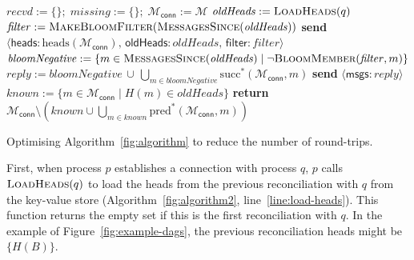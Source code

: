\documentclass[a4paper,anonymous,USenglish]{lipics-v2019}
\begin{document}
\begin{algorithm}[t]
    \begin{algorithmic}[1]
        \State $\mathit{recvd} := \{\};\; \mathit{missing} := \{\};\; \mathcal{M}_\mathsf{conn} := \mathcal{M}$ 
        \State $\mathit{oldHeads} := \Call{LoadHeads}{q}$\label{line:load-heads}
        \State $\mathit{filter} := \textsc{MakeBloomFilter}(\Call{MessagesSince}{\mathit{oldHeads}})$\label{line:make-bloom}
        \State \textbf{send} $\langle\mathsf{heads}: \mathrm{heads}(\mathcal{M}_\mathsf{conn}),\, \mathsf{oldHeads}: \mathit{oldHeads},\, \mathsf{filter}: \mathit{filter}\rangle$ \label{line:a2-send-heads}
    \EndOn
    \State
    \label{line:a2-recv-heads}
        \State $\mathit{bloomNegative} := \{m \in \Call{MessagesSince}{\mathit{oldHeads}} \mid \neg\Call{BloomMember}{\mathit{filter}, m}\}$\label{line:bloom-member}
        \State $\mathit{reply} := \mathit{bloomNegative} \,\cup\, \bigcup_{m \in \mathit{bloomNegative}} \mathrm{succ}^*(\mathcal{M}_\mathsf{conn}, m)$\label{line:bloom-succ}
            \State \textbf{send} $\langle\mathsf{msgs}: \mathit{reply}\rangle$ \label{line:a2-heads-reply}
        \EndIf
        \State {} \label{line:a2-heads-missing}
    \EndOn
    \State
        \State $\mathit{known} := \{m \in \mathcal{M}_\mathsf{conn} \mid H(m) \in \mathit{oldHeads}\}$
        \State \textbf{return} $\mathcal{M}_\mathsf{conn} \setminus \left(\mathit{known} \cup \bigcup_{m \in \mathit{known}} \mathrm{pred}^*(\mathcal{M}_\mathsf{conn}, m)\right)$
    \EndFunction
    \end{algorithmic}
    \caption{Optimising Algorithm~\ref{fig:algorithm} to reduce the number of round-trips.}\label{fig:algorithm2}
\end{algorithm}

First, when process $p$ establishes a connection with process $q$, $p$ calls $\textsc{LoadHeads}(q)$ to load the heads from the previous reconciliation with $q$ from the key-value store (Algorithm~\ref{fig:algorithm2}, line~\ref{line:load-heads}).
This function returns the empty set if this is the first reconciliation with $q$.
In the example of Figure~\ref{fig:example-dags}, the previous reconciliation heads might be $\{H(B)\}$.
\end{document}

